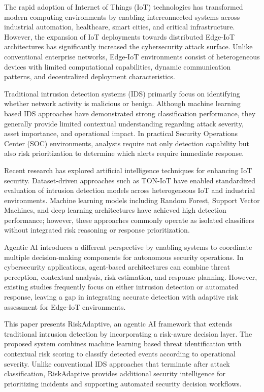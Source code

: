 The rapid adoption of Internet of Things (IoT) technologies has
transformed modern computing environments by enabling interconnected
systems across industrial automation, healthcare, smart cities, and
critical infrastructure. However, the expansion of IoT deployments
towards distributed Edge-IoT architectures has significantly increased
the cybersecurity attack surface. Unlike conventional enterprise
networks, Edge-IoT environments consist of heterogeneous devices with
limited computational capabilities, dynamic communication patterns,
and decentralized deployment characteristics.

Traditional intrusion detection systems (IDS) primarily focus on
identifying whether network activity is malicious or benign. Although
machine learning based IDS approaches have demonstrated strong
classification performance, they generally provide limited contextual
understanding regarding attack severity, asset importance, and
operational impact. In practical Security Operations Center (SOC)
environments, analysts require not only detection capability but also
risk prioritization to determine which alerts require immediate
response.

Recent research has explored artificial intelligence techniques for
enhancing IoT security. Dataset-driven approaches such as TON-IoT have
enabled standardized evaluation of intrusion detection models across
heterogeneous IoT and industrial environments. Machine learning models
including Random Forest, Support Vector Machines, and deep learning
architectures have achieved high detection performance; however, these
approaches commonly operate as isolated classifiers without integrated
risk reasoning or response prioritization.

Agentic AI introduces a different perspective by enabling systems to
coordinate multiple decision-making components for autonomous security
operations. In cybersecurity applications, agent-based architectures
can combine threat perception, contextual analysis, risk estimation,
and response planning. However, existing studies frequently focus on
either intrusion detection or automated response, leaving a gap in
integrating accurate detection with adaptive risk assessment for
Edge-IoT environments.

This paper presents RiskAdaptive, an agentic AI framework that extends
traditional intrusion detection by incorporating a risk-aware decision
layer. The proposed system combines machine learning based threat
identification with contextual risk scoring to classify detected
events according to operational severity. Unlike conventional IDS
approaches that terminate after attack classification, RiskAdaptive
provides additional security intelligence for prioritizing incidents
and supporting automated security decision workflows.

